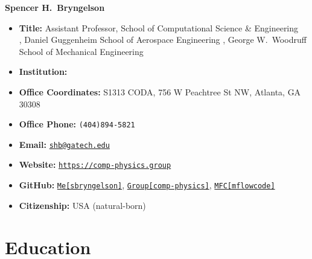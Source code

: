 




\begin{center}
    {\LARGE \bf Spencer H.\ Bryngelson} 
\end{center}

\begin{itemize}
    \item[] \textbf{Title:} Assistant Professor, School of Computational Science \& Engineering \\
         \APBC, Daniel Guggenheim School of Aerospace Engineering 
         \APBC, George W.\ Woodruff School of Mechanical Engineering
    \item[] \textbf{Institution:} \GIT
    \item[] \textbf{Office Coordinates:} S1313 CODA, 756 W Peachtree St NW, Atlanta, GA 30308
    \item[] \textbf{Office Phone:} \texttt{(404)894-5821}
    \item[] \textbf{Email:} \href{mailto:shb@gatech.edu}{\texttt{shb@gatech.edu}}
    \item[] \textbf{Website:} \href{https://comp-physics.group}{\texttt{https://comp-physics.group}}
    \item[] \textbf{GitHub:}
        \href{https://github.com/sbryngelson}{\tt Me[sbryngelson]}, 
        \href{https://github.com/comp-physics}{\tt Group[comp-physics]}, 
        \href{https://github.com/mflowcode}{\tt MFC[mflowcode]}
    \item[] \textbf{Citizenship:} USA (natural-born)
\end{itemize}

\vspace{-0.25cm}

\begingroup
\hypersetup{linkcolor=darkrust}    %
\begin{spacing}{0.89}
\setlength{\cftbeforesecskip}{1.5pt} 
\tableofcontents
\end{spacing}
\endgroup

\section{Education}


